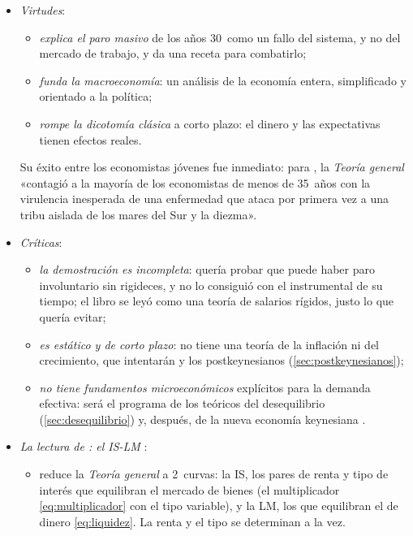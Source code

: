 \documentclass[11pt]{article}
\begin{document}
\begin{itemize}
\item \emph{Virtudes}:
  \begin{itemize}
  \item \emph{explica el paro masivo} de los años 30~como un fallo del sistema, y no del mercado de trabajo, y da una receta para combatirlo;
  \item \emph{funda la macroeconomía}: un análisis de la economía entera, simplificado y orientado a la política\nocite{DeVroey2016History};
  \item \emph{rompe la dicotomía clásica} a corto plazo: el dinero y las expectativas tienen efectos reales.
  \end{itemize}
  Su éxito entre los economistas jóvenes fue inmediato: para \textcite[pág.~187; traducción propia]{Samuelson1946Lord}, la \emph{Teoría general} «contagió a la mayoría de los economistas de menos de 35~años con la virulencia inesperada de una enfermedad que ataca por primera vez a una tribu aislada de los mares del Sur y la diezma».
\item \emph{Críticas}:
  \begin{itemize}
  \item \emph{la demostración es incompleta}:  quería probar que puede haber paro involuntario sin rigideces, y no lo consiguió con el instrumental de su tiempo; el libro se leyó como una teoría de salarios rígidos, justo lo que quería evitar\nocite{DeVroey2016History};
  \item \emph{es estático y de corto plazo}: no tiene una teoría de la inflación ni del crecimiento, que intentarán  y los postkeynesianos (\ref{sec:postkeynesianos});
  \item \emph{no tiene fundamentos microeconómicos} explícitos para la demanda efectiva: será el programa de los teóricos del desequilibrio (\ref{sec:desequilibrio}) y, después, de la nueva economía keynesiana .
  \end{itemize}
\item \emph{La lectura de : el IS-LM} :
  \begin{itemize}
  \item \textcite{Hicks1937Keynes} reduce la \emph{Teoría general} a 2~curvas: la IS, los pares de renta y tipo de interés que equilibran el mercado de bienes (el multiplicador \eqref{eq:multiplicador} con el tipo variable), y la LM, los que equilibran el de dinero \eqref{eq:liquidez}. La renta y el tipo se determinan a la vez.

\end{itemize}
\end{itemize}
\end{document}
